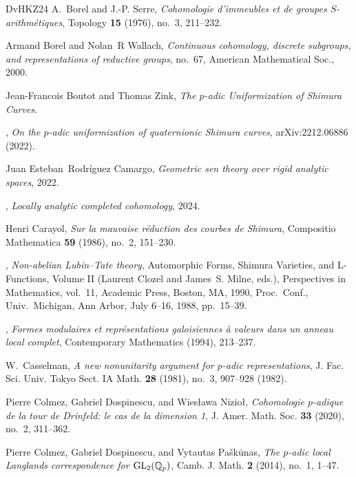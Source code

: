 \documentclass{article}
\theoremstyle{definition}
\begin{document}
\begin{thebibliography}{DvHKZ24}
A.~Borel and J.-P. Serre, \emph{Cohomologie d'immeubles et de groupes {$S$}-arithm\'etiques}, Topology \textbf{15} (1976), no.~3, 211--232. 

Armand Borel and Nolan~R Wallach, \emph{Continuous cohomology, discrete subgroups, and representations of reductive groups}, no.~67, American Mathematical Soc., 2000.

Jean-Francois Boutot and Thomas Zink, \emph{The $p$-adic {Uniformization} of {Shimura} {Curves}}.

\bysame, \emph{{On the $p$-adic uniformization of quaternionic Shimura curves}}, arXiv:2212.06886 (2022).

Juan Esteban~Rodríguez Camargo, \emph{Geometric sen theory over rigid analytic spaces}, 2022.

\bysame, \emph{Locally analytic completed cohomology}, 2024.

Henri Carayol, \emph{{Sur la mauvaise r{\'e}duction des courbes de Shimura}}, Compositio Mathematica \textbf{59} (1986), no.~2, 151--230.

\bysame, \emph{Non-abelian {Lubin--Tate} theory}, Automorphic Forms, Shimura Varieties, and L-Functions, Volume II (Laurent Clozel and James~S. Milne, eds.), Perspectives in Mathematics, vol.~11, Academic Press, Boston, MA, 1990, Proc.\ Conf., Univ.\ Michigan, Ann Arbor, July 6–16, 1988, pp.~15--39.

\bysame, \emph{{Formes modulaires et repr{\'e}sentations galoisiennes {\`a} valeurs dans un anneau local complet}}, Contemporary Mathematics (1994), 213--237.

W.~Casselman, \emph{A new nonunitarity argument for {$p$}-adic representations}, J. Fac. Sci. Univ. Tokyo Sect. IA Math. \textbf{28} (1981), no.~3, 907--928 (1982). 

Pierre Colmez, Gabriel Dospinescu, and Wiesława Nizioł, \emph{Cohomologie {$p$}-adique de la tour de {D}rinfeld: le cas de la dimension 1}, J. Amer. Math. Soc. \textbf{33} (2020), no.~2, 311--362. 

Pierre Colmez, Gabriel Dospinescu, and Vytautas Pa{\v{s}}k{\=u}nas, \emph{The {$p$}-adic local {L}anglands correspondence for {${\rm GL}_2(\Bbb Q_p)$}}, Camb. J. Math. \textbf{2} (2014), no.~1, 1--47. 


\end{thebibliography}
\end{document}

